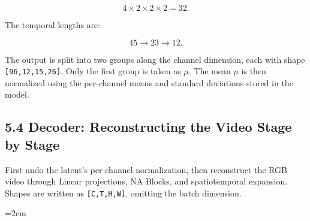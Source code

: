 \documentclass[
  11pt,
  a4paper,
]{article}
\newcommand{\NotesTableStyle}{\linespread{1}\fontsize{9.5pt}{13pt}\selectfont\setlength{\tabcolsep}{4pt}\renewcommand{\arraystretch}{1.1}\setlength{\extrarowheight}{5pt}\setlength{\LTpre}{5pt}\setlength{\LTpost}{6pt}\setlength{\parskip}{0pt}\emergencystretch=2em}
\begin{document}
\[
4\times2\times2\times2=32.
\]

The temporal lengths are:

\[
45\rightarrow23\rightarrow12.
\]

The output is split into two groups along the channel dimension, each
with shape \texttt{{[}96,12,15,26{]}}. Only the first group is taken as
\textbf{\(\mu\)}. The mean \(\mu\) is then normalized using the
per-channel means and standard deviations stored in the model.


\subsection{5.4 Decoder: Reconstructing the Video Stage by
Stage}\label{flux3-decoder}

First undo the latent's per-channel normalization, then reconstruct the
RGB video through Linear projections, NA Blocks, and spatiotemporal
expansion. Shapes are written as \texttt{{[}C,T,H,W{]}}, omitting the
batch dimension.

\begingroup\NotesTableStyle\fontsize{10pt}{12pt}\selectfont\renewcommand{\arraystretch}{1.02}\setlength{\extrarowheight}{1pt}
\end{document}
